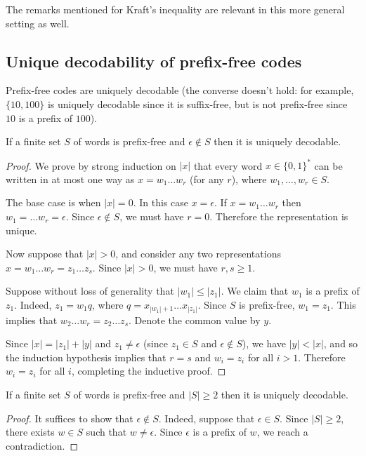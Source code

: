The remarks mentioned for Kraft's inequality are relevant in this more general setting as well.

\pagebreak

\subsection{Unique decodability of prefix-free codes}

Prefix-free codes are uniquely decodable (the converse doesn't hold: for example, $\{10,100\}$ is uniquely decodable since it is suffix-free, but is not prefix-free since $10$ is a prefix of $100$).

\begin{theorem} \label{thm:prefix-free-ud}
If a finite set $S$ of words is prefix-free and $\epsilon \notin S$ then it is uniquely decodable.
\end{theorem}
\begin{proof}
We prove by strong induction on $|x|$ that every word $x \in \{0,1\}^*$ can be written in at most one way as $x = w_1 \dots w_r$ (for any $r$), where $w_1,\dots,w_r \in S$.

The base case is when $|x| = 0$. In this case $x = \epsilon$. If $x = w_1 \dots w_r$ then $w_1 = \dots w_r = \epsilon$. Since $\epsilon \notin S$, we must have $r = 0$. Therefore the representation is unique.

Now suppose that $|x| > 0$, and consider any two representations $x = w_1 \dots w_r = z_1 \dots z_s$. Since $|x| > 0$, we must have $r,s \geq 1$.

Suppose without loss of generality that $|w_1| \leq |z_1|$. We claim that $w_1$ is a prefix of $z_1$. Indeed, $z_1 = w_1 q$, where $q = x_{|w_1|+1} \dots x_{|z_1|}$. Since $S$ is prefix-free, $w_1 = z_1$. This implies that $w_2 \dots w_r = z_2 \dots z_s$. Denote the common value by $y$.

Since $|x| = |z_1| + |y|$ and $z_1 \neq \epsilon$ (since $z_1 \in S$ and $\epsilon \notin S$), we have $|y| < |x|$, and so the induction hypothesis implies that $r = s$ and $w_i = z_i$ for all $i > 1$. Therefore $w_i = z_i$ for all $i$, completing the inductive proof.
\end{proof}

\begin{corollary}
If a finite set $S$ of words is prefix-free and $|S| \geq 2$ then it is uniquely decodable.
\end{corollary}
\begin{proof}
It suffices to show that $\epsilon \notin S$. Indeed, suppose that $\epsilon \in S$. Since $|S| \geq 2$, there exists $w \in S$ such that $w \neq \epsilon$. Since $\epsilon$ is a prefix of $w$, we reach a contradiction.
\end{proof}

